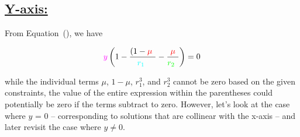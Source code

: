 \subsection*{\underline{Y-axis:}}

From Equation~(), we have

\begin{equation}
    \textcolor{magenta}{y} \left( 1 - \ddfrac{\left(1-\cred\mu\cw\right)}{\cc r_1 \cw ^3} - \ddfrac{\cred\mu\cw}{\cg r_2 \cw ^3} \right) = 0
    \label{eq:rootsY}
\end{equation}

while the individual terms $\mu$, $1-\mu$, $r_1^3$, and $r_2^3$ cannot be zero based on the given constraints, the value of the entire expression within the parentheses could potentially be zero if the terms subtract to zero. However, let's look at the case where $y$ = 0 -- corresponding to solutions that are collinear with the x-axis -- and later revisit the case where $y \neq 0$.